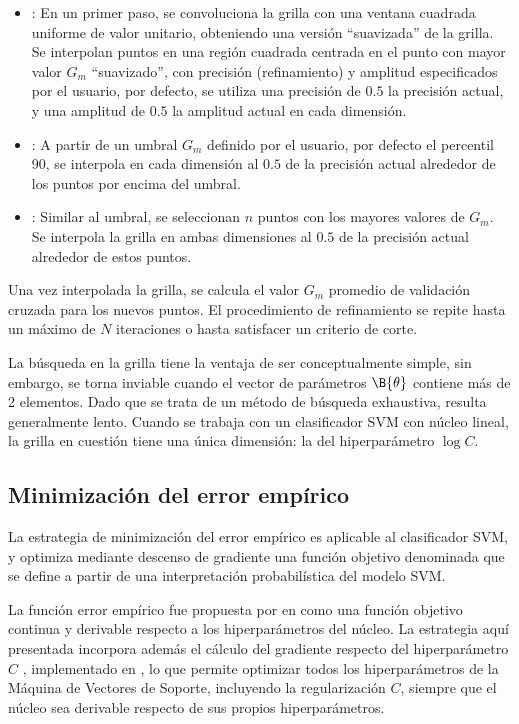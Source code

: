 \begin{itemize}
\item {}: En un primer paso, se convoluciona la grilla con una
  ventana cuadrada uniforme de valor unitario, obteniendo una versión
  ``suavizada'' de la grilla. Se interpolan puntos en una región
  cuadrada centrada en el punto con mayor valor $G_m$ ``suavizado'',
  con precisión (refinamiento) y amplitud especificados por el
  usuario, por defecto, se utiliza una precisión de $0.5$ la precisión
  actual, y una amplitud de $0.5$ la amplitud actual en cada
  dimensión.
\item {}: A partir de un umbral $G_m$ definido por el usuario,
  por defecto el percentil 90, se interpola en cada dimensión al $0.5$
  de la precisión actual alrededor de los puntos por encima del
  umbral.
\item {}: Similar al umbral, se seleccionan $n$ puntos
  con los mayores valores de $G_m$. Se interpola la grilla en ambas
  dimensiones al $0.5$ de la precisión actual alrededor de estos
  puntos.
\end{itemize}
Una vez interpolada la grilla, se calcula el valor $G_m$ promedio de
validación cruzada para los nuevos puntos. El procedimiento de
refinamiento se repite hasta un máximo de $N$ iteraciones o hasta
satisfacer un criterio de corte.

La búsqueda en la grilla tiene la ventaja de ser conceptualmente
simple, sin embargo, se torna inviable cuando el vector de parámetros
$\B{\theta}$ contiene más de 2 elementos. Dado que se trata de un
método de búsqueda exhaustiva, resulta generalmente lento.  Cuando se
trabaja con un clasificador SVM con núcleo lineal, la grilla en
cuestión tiene una única dimensión: la del hiperparámetro $\log C$.

\subsection{Minimización del error empírico}
La estrategia de minimización del error empírico es aplicable al
clasificador SVM, y optimiza mediante descenso de gradiente una
función objetivo denominada  que se define a partir
de una interpretación probabilística del modelo SVM.

La función error empírico fue propuesta por \citeauthor{ayat} en
\cite{ayat} como una función objetivo continua y derivable respecto a
los hiperparámetros del núcleo.  La estrategia aquí presentada
incorpora además el cálculo del gradiente respecto del hiperparámetro
$C$ \cite{keerthi,glasmachers}, implementado en \cite{shark}, lo que
permite optimizar todos los hiperparámetros de la Máquina de Vectores
de Soporte, incluyendo la regularización $C$, siempre que el núcleo
sea derivable respecto de sus propios hiperparámetros.

